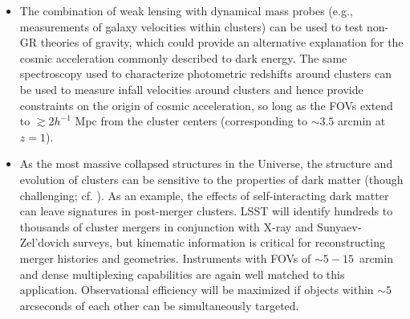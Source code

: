\begin{itemize}
\item The combination of weak lensing with dynamical mass probes (e.g., measurements of galaxy velocities within clusters) can be used to test non-GR theories of gravity, which could provide an alternative explanation for the cosmic acceleration commonly described to dark energy. The same spectroscopy used to characterize photometric redshifts around clusters can be used to measure infall velocities around clusters and hence provide constraints on the origin of cosmic acceleration, so long as the FOVs extend to $\gtrsim 2h^{-1}$ Mpc from the cluster centers (corresponding to $\sim 3.5$ arcmin at $z=1$).

\item As the most massive collapsed structures in the Universe, the structure
and evolution of clusters can be sensitive to the properties of dark matter (though challenging; cf. 
\citealt{Peter}). As an example, the
effects of self-interacting dark matter can leave signatures in post-merger clusters.  LSST will identify hundreds to thousands of cluster mergers in conjunction with X-ray and Sunyaev-Zel'dovich surveys, but kinematic
information is critical for reconstructing  merger histories and geometries.
Instruments with FOVs of $\sim 5-15$~arcmin and dense multiplexing capabilities are
again well matched to this application. Observational efficiency will be maximized if objects within $\sim5$arcseconds of each other can be simultaneously targeted. 
\end{itemize}

